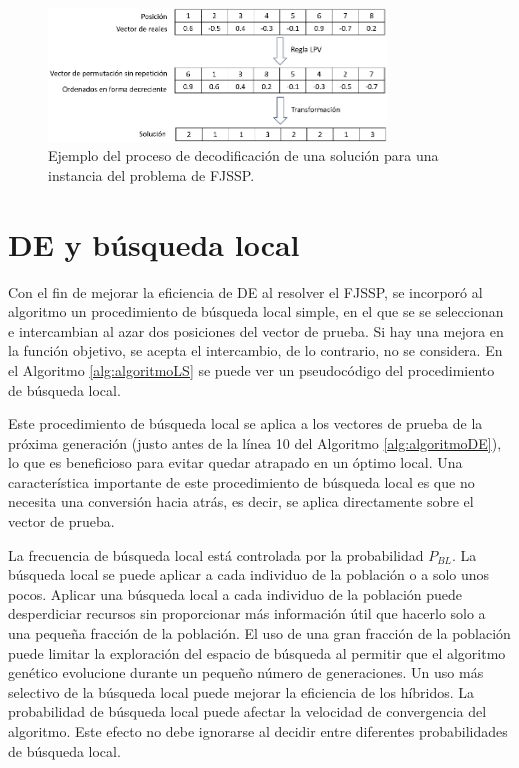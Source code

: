 \begin{figure}[h]
    \centering
    \includegraphics[width=0.8\textwidth]{images/Decodificacion.eps}
    \caption{Ejemplo del proceso de decodificación de una solución para una instancia del problema de FJSSP.}
    \label{fig:decodificacion}
\end{figure}

\section{DE y búsqueda local}

Con el fin de mejorar la eficiencia de DE al resolver el FJSSP, se incorporó al algoritmo un procedimiento de búsqueda local simple, en el que se se seleccionan e intercambian al azar dos posiciones del vector de prueba. Si hay una mejora en la función objetivo, se acepta el intercambio, de lo contrario, no se considera. En el Algoritmo \ref{alg:algoritmoLS} se puede ver un pseudocódigo del procedimiento de búsqueda local.


Este procedimiento de búsqueda local se aplica a los vectores de prueba de la próxima generación (justo antes de la línea 10 del Algoritmo \ref{alg:algoritmoDE}), lo que es beneficioso para evitar quedar atrapado en un óptimo local. Una característica importante de este procedimiento de búsqueda local es que no necesita una conversión hacia atrás, es decir, se aplica directamente sobre el vector de prueba. 


La frecuencia de búsqueda local está controlada por la probabilidad $P_{BL}$. La búsqueda local se puede aplicar a cada individuo de la población o a solo unos pocos. Aplicar una búsqueda local a cada individuo de la población puede desperdiciar recursos sin proporcionar más información útil que hacerlo solo a una pequeña fracción de la población. El uso de una gran fracción de la población puede limitar la exploración del espacio de búsqueda al permitir que el algoritmo genético evolucione durante un pequeño número de generaciones. Un uso más selectivo de la búsqueda local puede mejorar la eficiencia de los híbridos. La probabilidad de búsqueda local puede afectar la velocidad de convergencia del algoritmo. Este efecto no debe ignorarse al decidir entre diferentes probabilidades de búsqueda local.


